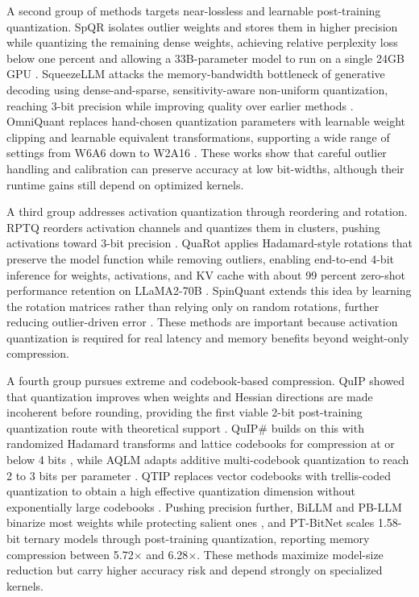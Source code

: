 \documentclass[
11pt, %
english, %
singlespacing, %
headsepline, %
]{MastersDoctoralThesis} %
\begin{document}
A second group of methods targets near-lossless and learnable post-training quantization. SpQR isolates outlier weights and stores them in higher precision while quantizing the remaining dense weights, achieving relative perplexity loss below one percent and allowing a 33B-parameter model to run on a single 24GB GPU \cite{dettmers2024spqr}. SqueezeLLM attacks the memory-bandwidth bottleneck of generative decoding using dense-and-sparse, sensitivity-aware non-uniform quantization, reaching 3-bit precision while improving quality over earlier methods \cite{kim2024squeezellm}. OmniQuant replaces hand-chosen quantization parameters with learnable weight clipping and learnable equivalent transformations, supporting a wide range of settings from W6A6 down to W2A16 \cite{shao2024omniquant}. These works show that careful outlier handling and calibration can preserve accuracy at low bit-widths, although their runtime gains still depend on optimized kernels.

A third group addresses activation quantization through reordering and rotation. RPTQ reorders activation channels and quantizes them in clusters, pushing activations toward 3-bit precision \cite{yuan2023rptq}. QuaRot applies Hadamard-style rotations that preserve the model function while removing outliers, enabling end-to-end 4-bit inference for weights, activations, and KV cache with about 99 percent zero-shot performance retention on LLaMA2-70B \cite{ashkboos2024quarot}. SpinQuant extends this idea by learning the rotation matrices rather than relying only on random rotations, further reducing outlier-driven error \cite{liu2025spinquant}. These methods are important because activation quantization is required for real latency and memory benefits beyond weight-only compression.

A fourth group pursues extreme and codebook-based compression. QuIP showed that quantization improves when weights and Hessian directions are made incoherent before rounding, providing the first viable 2-bit post-training quantization route with theoretical support \cite{chee2023quip}. QuIP\# builds on this with randomized Hadamard transforms and lattice codebooks for compression at or below 4 bits \cite{tseng2024quipsharp}, while AQLM adapts additive multi-codebook quantization to reach 2 to 3 bits per parameter \cite{egiazarian2024aqlm}. QTIP replaces vector codebooks with trellis-coded quantization to obtain a high effective quantization dimension without exponentially large codebooks \cite{tseng2024qtip}. Pushing precision further, BiLLM and PB-LLM binarize most weights while protecting salient ones \cite{huang2024billm,shang2023pbllm}, and PT-BitNet scales 1.58-bit ternary models through post-training quantization, reporting memory compression between 5.72$\times$ and 6.28$\times$\cite{survey2025ptbitnet}. These methods maximize model-size reduction but carry higher accuracy risk and depend strongly on specialized kernels.
\end{document}

